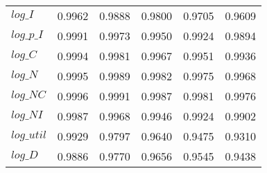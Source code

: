 \begin{center}
\begin{longtable}{lccccc}
$log\_I     $	 & 	    0.9962	 & 	    0.9888	 & 	    0.9800	 & 	    0.9705	 & 	    0.9609 \\ 
$log\_p\_I  $	 & 	    0.9991	 & 	    0.9973	 & 	    0.9950	 & 	    0.9924	 & 	    0.9894 \\ 
$log\_C     $	 & 	    0.9994	 & 	    0.9981	 & 	    0.9967	 & 	    0.9951	 & 	    0.9936 \\ 
$log\_N     $	 & 	    0.9995	 & 	    0.9989	 & 	    0.9982	 & 	    0.9975	 & 	    0.9968 \\ 
$log\_NC    $	 & 	    0.9996	 & 	    0.9991	 & 	    0.9987	 & 	    0.9981	 & 	    0.9976 \\ 
$log\_NI    $	 & 	    0.9987	 & 	    0.9968	 & 	    0.9946	 & 	    0.9924	 & 	    0.9902 \\ 
$log\_util  $	 & 	    0.9929	 & 	    0.9797	 & 	    0.9640	 & 	    0.9475	 & 	    0.9310 \\ 
$log\_D     $	 & 	    0.9886	 & 	    0.9770	 & 	    0.9656	 & 	    0.9545	 & 	    0.9438 \\ 
\end{longtable}
 \end{center}
